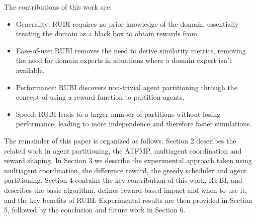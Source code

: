 \documentclass[letterpaper]{article}
\begin{document}
 
The contributions of this work are:
\begin{itemize} 
\item Generality: RUBI requires no prior knowledge of the domain, essentially treating the domain as a black box to obtain rewards from.
\item Ease-of-use: RUBI removes the need to derive similarity metrics, removing the need for domain experts in situations where a domain expert isn't available.
\item Performance: RUBI discovers non-trivial agent partitioning through the concept of using a reward function to partition agents.
\item Speed: RUBI leads to a larger number of partitions without losing performance, leading to more independence and therefore faster simulations.
\end{itemize} 
 
The remainder of this paper is organized as follows. Section 2 describes the related work in agent partitioning, the ATFMP, multiagent coordination and reward shaping. In Section 3 we describe the experimental approach taken using multiagent coordination, the difference reward, the greedy scheduler and agent partitioning. Section 4 contains the key contribution of this work, RUBI, and describes the basic algorithm, defines reward-based impact and when to use it, and the key benefits of RUBI. Experimental results are then provided in Section 5, followed by the conclusion and future work in Section 6.
\end{document}
